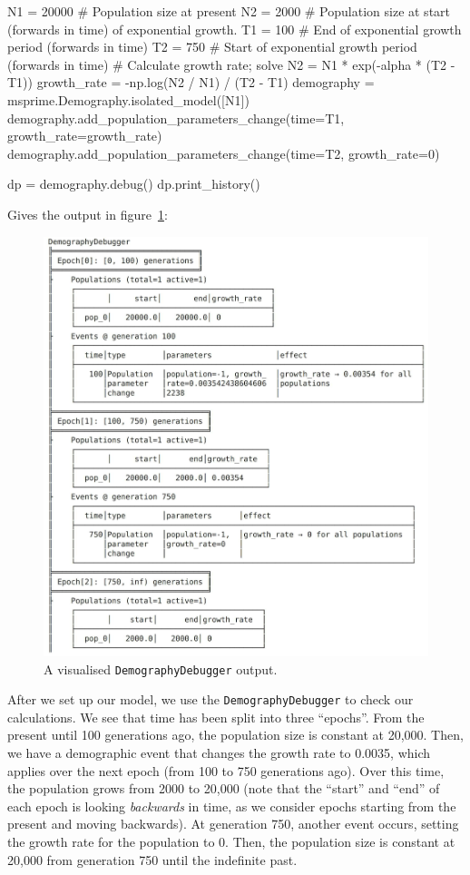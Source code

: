 \documentclass[graybox]{svmult}
\begin{document}
\begin{pythoncode}
N1 = 20000  # Population size at present
N2 = 2000   # Population size at start (forwards in time) of exponential growth.
T1 = 100    # End of exponential growth period (forwards in time)
T2 = 750    # Start of exponential growth period (forwards in time)
# Calculate growth rate; solve N2 = N1 * exp(-alpha * (T2 - T1))
growth_rate = -np.log(N2 / N1) / (T2 - T1)
demography = msprime.Demography.isolated_model([N1])
demography.add_population_parameters_change(time=T1, growth_rate=growth_rate)
demography.add_population_parameters_change(time=T2, growth_rate=0)

dp = demography.debug()
dp.print_history()
\end{pythoncode}

Gives the output in figure~\ref{fig:DemographyDebugger}:

\begin{figure}[t]
\centering
\includegraphics[width=\textwidth]{images/DemographyDebugger.pdf}
\caption{\label{fig:DemographyDebugger}A visualised \texttt{DemographyDebugger} output.}
\end{figure}

    After we set up our model, we use the \texttt{DemographyDebugger} to
check our calculations. We see that time has been split into three
``epochs''. From the present until 100 generations ago, the
population size is constant at 20,000. Then, we have a demographic event
that changes the growth rate to 0.0035, which applies over the next
epoch (from 100 to 750 generations ago). Over this time, the population
grows from 2000 to 20,000 (note that the ``start'' and
``end'' of each epoch is looking \emph{backwards} in time, as we consider
epochs starting from the present and moving backwards). At generation
750, another event occurs, setting the growth rate for the population to
0. Then, the population size is constant at 20,000 from generation 750
until the indefinite past.
\end{document}
